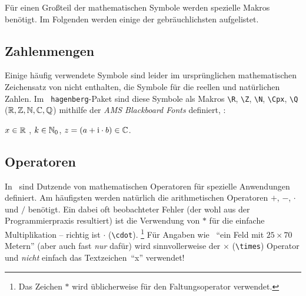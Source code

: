Für einen Großteil der mathematischen Symbole werden spezielle Makros benötigt. Im Folgenden werden einige der gebräuchlichsten aufgelistet.

\subsection{Zahlenmengen}
Einige häufig verwendete Symbole sind leider im ursprünglichen
mathematischen Zeichensatz von \latex nicht enthalten, \zB die
Symbole für die reellen und natürlichen Zahlen. Im {\tt
hagenberg}-Paket sind diese Symbole als Makros 
\verb!\R!, \verb!\Z!, \verb!\N!, \verb!\Cpx!, \verb!\Q!
($\mathbb{R}, \mathbb{Z}, \mathbb{N}, \mathbb{C}, \mathbb{Q}$)
mithilfe der \emph{AMS Blackboard Fonts} definiert, \zB:
\begin{center}
$x \in \mathbb{R}$ , $k \in \mathbb{N}_0$, $z = (a + \mathrm{i} \cdot b) \in \mathbb{C}$.
\end{center}


\subsection{Operatoren}

In \latex\ sind Dutzende von mathematischen Operatoren für spezielle Anwendungen definiert. Am häufigsten werden natürlich die arithmetischen Operatoren $+$, $-$, $\cdot$ und $/$ benötigt. Ein dabei oft beobachteter Fehler (der wohl aus der Programmierpraxis resultiert) ist die Verwendung von $*$ für die einfache Multiplikation -- richtig ist $\cdot$ (\verb!\cdot!).%
\footnote{Das Zeichen $*$ wird üblicherweise für den Faltungsoperator verwendet.}
%
Für Angaben wie \zB\ "`ein Feld mit $25 \times 70$ Metern"' (aber auch fast \emph{nur} dafür) wird sinnvollerweise der $\times$ (\verb!\times!) Operator und \emph{nicht} einfach das Textzeichen~"`x"' verwendet!


